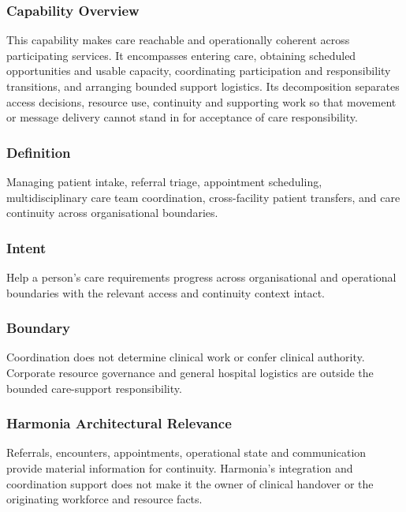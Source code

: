 \subsubsection*{Capability Overview}

This capability makes care reachable and operationally coherent across participating services. It encompasses entering care, obtaining scheduled opportunities and usable capacity, coordinating participation and responsibility transitions, and arranging bounded support logistics. Its decomposition separates access decisions, resource use, continuity and supporting work so that movement or message delivery cannot stand in for acceptance of care responsibility.

\subsubsection*{Definition}

Managing patient intake, referral triage, appointment scheduling, multidisciplinary care team coordination, cross-facility patient transfers, and care continuity across organisational boundaries.

\subsubsection*{Intent}

Help a person's care requirements progress across organisational and operational boundaries with the relevant access and continuity context intact.

\subsubsection*{Boundary}

Coordination does not determine clinical work or confer clinical authority. Corporate resource governance and general hospital logistics are outside the bounded care-support responsibility.

\subsubsection*{Harmonia Architectural Relevance}

Referrals, encounters, appointments, operational state and communication provide material information for continuity. Harmonia's integration and coordination support does not make it the owner of clinical handover or the originating workforce and resource facts.

